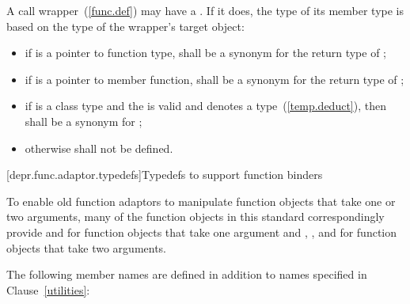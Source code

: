 \pnum
A call wrapper~(\ref{func.def}) may have a .
If it does, the type of its member type 
is based on the type  of the wrapper's target object:
\begin{itemize}
\item if  is a pointer to function type,
 shall be a synonym for the return type of ;
\item if  is a pointer to member function,
 shall be a synonym for the return type of ;
\item if  is a class type
and the   is valid and denotes a type~(\ref{temp.deduct}),
then  shall be a synonym for ;
\item otherwise  shall not be defined.
\end{itemize}

[depr.func.adaptor.typedefs]{Typedefs to support function binders}

\pnum
To enable old function adaptors to manipulate function objects
that take one or two arguments,
many of the function objects in this standard
correspondingly provide 
 and 
for function objects that take one argument and
, , and 
for function objects that take two arguments.

\pnum
The following member names are defined in addition to names specified in Clause~\ref{utilities}:

